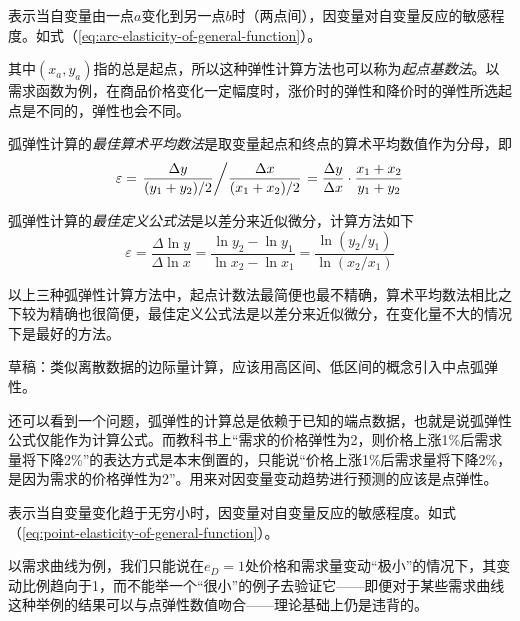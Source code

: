 \begin{Definition}[弧弹性]
表示当自变量由一点$a$变化到另一点$b$时（两点间），因变量对自变量反应的敏感程度。如式（\ref{eq:arc-elasticity-of-general-function}）。
\end{Definition}

其中$(x_a, y_a)$指的总是起点，所以这种弹性计算方法也可以称为\emph{起点基数法}。以需求函数为例，在商品价格变化一定幅度时，涨价时的弹性和降价时的弹性所选起点是不同的，弹性也会不同。

弧弹性计算的\emph{最佳算术平均数法}是取变量起点和终点的算术平均数值作为分母，即
\begin{equation}
\varepsilon = \left. { \frac{\Delta y}{(y_1 + y_2)/2}} \middle/ {\frac{\Delta x}{(x_1 + x_2)/2}} \right. = \frac{\Delta y}{\Delta x} \cdot \frac{x_1 + x_2}{y_1 + y_2}
\label{eq:elasticity-zhongdianfa}
\end{equation}

弧弹性计算的\emph{最佳定义公式法}是以差分来近似微分，计算方法如下
\begin{equation}
\varepsilon = \frac{\Delta \ln y}{\Delta \ln x}=\frac{\ln y_2 - \ln y_1}{\ln x_2 - \ln x_1} = \frac{\ln (y_2/y_1)}{\ln (x_2/x_1)}
\label{eq:elasticity-zuijiadingyigongshifa}
\end{equation}

以上三种弧弹性计算方法中，起点计数法最简便也最不精确，算术平均数法相比之下较为精确也很简便，最佳定义公式法是以差分来近似微分，在变化量不大的情况下是最好的方法。

草稿：类似离散数据的边际量计算，应该用高区间、低区间的概念引入中点弧弹性。

还可以看到一个问题，弧弹性的计算总是依赖于已知的端点数据，也就是说弧弹性公式仅能作为计算公式。而教科书上“需求的价格弹性为2，则价格上涨1\%后需求量将下降2\%”的表达方式是本末倒置的，只能说“价格上涨1\%后需求量将下降2\%，是因为需求的价格弹性为2”。用来对因变量变动趋势进行预测的应该是点弹性。

\begin{Definition}[点弹性]
表示当自变量变化趋于无穷小时，因变量对自变量反应的敏感程度。如式（\ref{eq:point-elasticity-of-general-function}）。
\end{Definition}

以需求曲线为例，我们只能说在$e_D=1$处价格和需求量变动“极小”的情况下，其变动比例趋向于1，而不能举一个“很小”的例子去验证它——即便对于某些需求曲线这种举例的结果可以与点弹性数值吻合——理论基础上仍是违背的。


